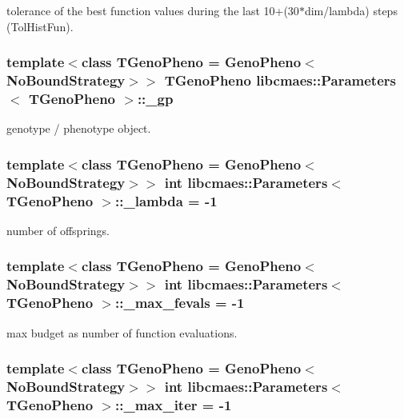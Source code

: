 tolerance of the best function values during the last 10+(30$\ast$dim/lambda) steps (Tol\-Hist\-Fun). \hypertarget{classlibcmaes_1_1Parameters_ab8e153b4785de9358599caa840b94ef2}{
\subsubsection[{\-\_\-gp}]{\setlength{\rightskip}{0pt plus 5cm}template$<$class T\-Geno\-Pheno = Geno\-Pheno$<$\-No\-Bound\-Strategy$>$$>$ T\-Geno\-Pheno {\bf libcmaes\-::\-Parameters}$<$ T\-Geno\-Pheno $>$\-::\-\_\-gp}}\label{classlibcmaes_1_1Parameters_ab8e153b4785de9358599caa840b94ef2}
genotype / phenotype object. \hypertarget{classlibcmaes_1_1Parameters_af732f7206f23cbd6ec2bbd4e217a9a2b}{
\subsubsection[{\-\_\-lambda}]{\setlength{\rightskip}{0pt plus 5cm}template$<$class T\-Geno\-Pheno = Geno\-Pheno$<$\-No\-Bound\-Strategy$>$$>$ int {\bf libcmaes\-::\-Parameters}$<$ T\-Geno\-Pheno $>$\-::\-\_\-lambda = -\/1}}\label{classlibcmaes_1_1Parameters_af732f7206f23cbd6ec2bbd4e217a9a2b}
number of offsprings. \hypertarget{classlibcmaes_1_1Parameters_ad316488121bd51f62b28e8183d591c9e}{
\subsubsection[{\-\_\-max\-\_\-fevals}]{\setlength{\rightskip}{0pt plus 5cm}template$<$class T\-Geno\-Pheno = Geno\-Pheno$<$\-No\-Bound\-Strategy$>$$>$ int {\bf libcmaes\-::\-Parameters}$<$ T\-Geno\-Pheno $>$\-::\-\_\-max\-\_\-fevals = -\/1}}\label{classlibcmaes_1_1Parameters_ad316488121bd51f62b28e8183d591c9e}
max budget as number of function evaluations. \hypertarget{classlibcmaes_1_1Parameters_a60abfc730c5aa46e42ebd1598b59caa6}{
\subsubsection[{\-\_\-max\-\_\-iter}]{\setlength{\rightskip}{0pt plus 5cm}template$<$class T\-Geno\-Pheno = Geno\-Pheno$<$\-No\-Bound\-Strategy$>$$>$ int {\bf libcmaes\-::\-Parameters}$<$ T\-Geno\-Pheno $>$\-::\-\_\-max\-\_\-iter = -\/1}}\label{classlibcmaes_1_1Parameters_a60abfc730c5aa46e42ebd1598b59caa6}
